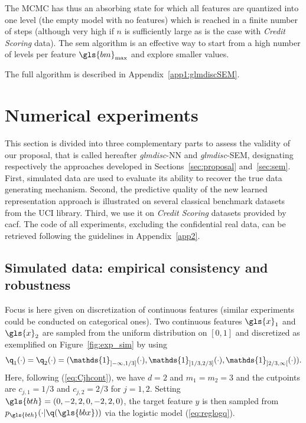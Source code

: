 The MCMC has thus an absorbing state for which all features are quantized into one level (the empty model with no features) which is reached in a finite number of steps (although very high if $n$ is sufficiently large as is the case with \textit{Credit Scoring} data). The \gls{sem} algorithm is an effective way to start from a high number of levels per feature $\gls{bm}_{\max}$ and explore smaller values.

The full algorithm is described in Appendix~\ref{app1:glmdiscSEM}.

\section{Numerical experiments} \label{sec:experiments}

This section is divided into three complementary parts to assess the validity of our proposal, that is called hereafter \textit{glmdisc}-NN and \textit{glmdisc}-SEM, designating respectively the approaches developed in Sections~\ref{sec:proposal} and~\ref{sec:sem}. First, simulated data are used to evaluate its ability to recover the true data generating mechanism. Second, the predictive quality of the new learned representation approach is illustrated on several classical benchmark datasets from the UCI library. Third, we use it on \textit{Credit Scoring} datasets provided by \gls{cacf}. The code of all experiments, excluding the confidential real data, can be retrieved following the guidelines in Appendix~\ref{app2}.


\subsection{Simulated data: empirical consistency and robustness}

Focus is here given on discretization of continuous features (similar experiments could be conducted on categorical ones). Two continuous features $\gls{x}_1$ and $\gls{x}_2$ are sampled from the uniform distribution on $[0,1]$ and discretized as exemplified on Figure~\ref{fig:exp_sim} by using
\[\q_1(\cdot)=\q_2(\cdot) = (\mathds{1}_{]-\infty,1/3]}(\cdot),\mathds{1}_{]1/3,2/3]}(\cdot),\mathds{1}_{]2/3,\infty[}(\cdot)).\]
Here, following (\ref{eq:Cjhcont}), we have $d=2$ and $m_1=m_2=3$ and the cutpoints are $c_{j,1}=1/3$ and $c_{j,2}=2/3$ for $j=1,2$. Setting $\gls{bth}=(0,-2,2,0,-2,2,0)$, the target feature $y$ is then sampled from $p_{\gls{bth}}(\cdot | \q(\gls{bbx}))$ via the logistic model (\ref{eq:reglogq}).

